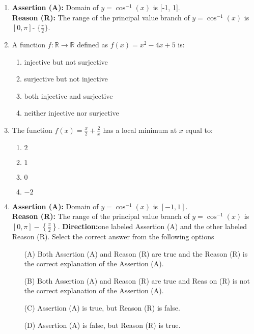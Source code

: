 \begin{enumerate}
	\item \textbf{Assertion (A):} Domain of $ y = \cos^{-1}(x) $ is [-1, 1].\\
		\textbf{Reason (R):} The range of the principal value branch of $ y = \cos^{-1}(x) $ is $[0, \pi]$- $\{\frac{\pi}{2}\}$.

\item A function $f: \mathbb{R} \to \mathbb{R}$ defined as $f(x) = x^2-4x+5$ is:
    \begin{enumerate}[label=(\alph*)]
        \item injective but not surjective
        \item surjective but not injective
        \item both injective and surjective
        \item neither injective nor surjective
    \end{enumerate}
    \item The function $f(x) = \frac{x}{2} + \frac{2}{x}$ has a local minimum at $x$ equal to:
\begin{enumerate}[label=(\alph*)]
    \item $2$
    \item $1$
    \item $0$
    \item $-2$
\end{enumerate}


    \item \textbf{Assertion (A):} Domain of $y = \cos^{-1}(x)$ is $[-1, 1]$.\\
    \textbf{Reason (R):} The range of the principal value branch of $y = \cos^{-1}(x)$ is $\left[0, \pi \right] - \left\{\frac{\pi}{2}\right\}$.
\textbf{Direction:}one labeled Assertion (A) and the other labeled  Reason (R). Select the correct answer from the following options
\begin{itemize}

\item[(A)] Both Assertion (A) and Reason (R) are true and the     Reason (R) is the correct explanation of the Assertion (A).       
\item[(B)] Both Assertion (A) and Reason (R) are true and Reas    on (R) is not the correct explanation of the Assertion (A).       
\item[(C)] Assertion (A) is true, but Reason (R) is false.     
\item[(D)] Assertion (A) is false, but Reason (R) is true.     
\end{itemize}



\end{enumerate}
